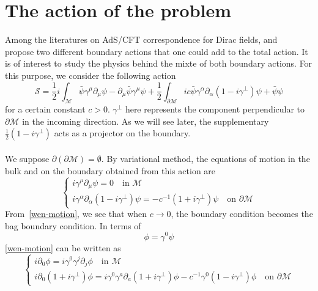 \section{The action of the problem}
Among the literatures on AdS/CFT correspondence for Dirac fields,
\cite{Henningson1998} and~\cite{Contino2005} propose two different boundary actions that one could add to the total action.
It is of interest to study the physics behind the mixte of both boundary actions. 
For this purpose,
we consider the following action
\begin{equation}\label{wen-action}
\mathcal{S} = \frac{1}{2}i\int_{\mathcal{M}} \bar{\psi} \gamma^\mu \partial_\mu \psi - \partial_\mu \bar{\psi} \gamma^\mu \psi 
+ \frac{1}{2}\int_{\partial \mathcal{M}} ic \bar{\psi} \gamma^\alpha \partial_\alpha (1 - i \gamma^\bot) \psi
+ \bar{\psi} \psi
\end{equation}
for a certain constant $c >0$. 
$\gamma^\bot$ here represents the component perpendicular to $\partial \mathcal{M}$ in the incoming direction. 
As we will see later, the supplementary $\frac 1 2 (1-i\gamma^\bot)$ acts as a projector on the boundary.
\\\\
We suppose $\partial(\partial \mathcal{M}) = \emptyset$.
By variational method, the equations of motion in the bulk and on the boundary obtained from this action are
\begin{equation}\label{wen-motion}
\begin{cases}
i \gamma^\mu \partial_\mu \psi = 0  \quad \textrm{in $\mathcal{M}$}\\
i \gamma^\alpha \partial_\alpha (1 - i\gamma^\bot) \psi = - c^{-1}(1 + i\gamma^{\bot}) \psi \quad \textrm{on $\partial \mathcal{M}$}
\end{cases}
\end{equation}
From~\cref{wen-motion}, we see that when $c \rightarrow 0$, the boundary condition becomes the bag boundary condition. 
In terms of 
\begin{equation*}
\phi = \gamma^0 \psi
\end{equation*}
\cref{wen-motion} can be written as 
\begin{equation}\label{wen-maineq}
\begin{cases}
i \partial_0 \phi = i \gamma^0 \gamma^j \partial_j \phi   \quad \textrm{in $\mathcal{M}$}\\
i \partial_0(1 + i\gamma^\bot) \phi = i\gamma^0 \gamma^a \partial_a (1+ i\gamma^\bot)\phi - c^{-1} \gamma^0(1 - i \gamma^{\bot})\phi \quad \textrm{on $\partial \mathcal{M}$}
\end{cases}
\end{equation}
